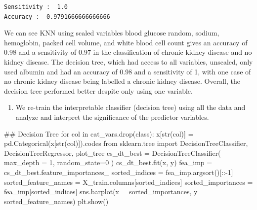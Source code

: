 \documentclass[
  11pt,
  letterpaper,
  DIV=11,
  numbers=noendperiod]{scrartcl}
\newenvironment{Shaded}{\begin{snugshade}}{\end{snugshade}}
\newcommand{\BuiltInTok}[1]{\textcolor[rgb]{0.00,0.23,0.31}{#1}}
\newcommand{\CommentTok}[1]{\textcolor[rgb]{0.37,0.37,0.37}{#1}}
\newcommand{\ControlFlowTok}[1]{\textcolor[rgb]{0.00,0.23,0.31}{#1}}
\newcommand{\DecValTok}[1]{\textcolor[rgb]{0.68,0.00,0.00}{#1}}
\newcommand{\ImportTok}[1]{\textcolor[rgb]{0.00,0.46,0.62}{#1}}
\newcommand{\KeywordTok}[1]{\textcolor[rgb]{0.00,0.23,0.31}{#1}}
\newcommand{\NormalTok}[1]{\textcolor[rgb]{0.00,0.23,0.31}{#1}}
\newcommand{\OperatorTok}[1]{\textcolor[rgb]{0.37,0.37,0.37}{#1}}
\newcommand{\StringTok}[1]{\textcolor[rgb]{0.13,0.47,0.30}{#1}}
\providecommand{\tightlist}{%
  \setlength{\itemsep}{0pt}\setlength{\parskip}{0pt}}\usepackage{longtable,booktabs,array}
\begin{document}
\begin{verbatim}
Sensitivity :  1.0
Accuracy :  0.9791666666666666
\end{verbatim}

We can see KNN using scaled variables blood glucose random, sodium,
hemoglobin, packed cell volume, and white blood cell count gives an
accuracy of 0.98 and a sensitivity of 0.97 in the classification of
chronic kidney disease and no kidney disease. The decision tree, which
had access to all variables, unscaled, only used albumin and had an
accuracy of 0.98 and a sensitivity of 1, with one case of no chronic
kidney disease being labelled a chronic kidney disease. Overall, the
decision tree performed better despite only using one variable.

\begin{enumerate}
\def\labelenumi{\arabic{enumi}.}
\setcounter{enumi}{12}
\tightlist
\item
  We re-train the interpretable classifier (decision tree) using all the
  data and analyze and interpret the significance of the predictor
  variables.
\end{enumerate}

\begin{Shaded}
\begin{Highlighting}[]
\CommentTok{\#\# Decision Tree}
\ControlFlowTok{for}\NormalTok{ col }\KeywordTok{in}\NormalTok{ cat\_vars.drop(}\StringTok{\textquotesingle{}class\textquotesingle{}}\NormalTok{):}
\NormalTok{    x[}\BuiltInTok{str}\NormalTok{(col)] }\OperatorTok{=}\NormalTok{ pd.Categorical(x[}\BuiltInTok{str}\NormalTok{(col)]).codes}
\ImportTok{from}\NormalTok{ sklearn.tree }\ImportTok{import}\NormalTok{ DecisionTreeClassifier, DecisionTreeRegressor, plot\_tree}
\NormalTok{cs\_dt\_best }\OperatorTok{=}\NormalTok{ DecisionTreeClassifier(}
\NormalTok{    max\_depth }\OperatorTok{=} \DecValTok{1}\NormalTok{, }
\NormalTok{    random\_state}\OperatorTok{=}\DecValTok{0}
\NormalTok{    ) }
\NormalTok{cs\_dt\_best.fit(x, y)}
\NormalTok{fea\_imp }\OperatorTok{=}\NormalTok{ cs\_dt\_best.feature\_importances\_}
\NormalTok{sorted\_indices }\OperatorTok{=}\NormalTok{ fea\_imp.argsort()[::}\OperatorTok{{-}}\DecValTok{1}\NormalTok{]}
\NormalTok{sorted\_feature\_names }\OperatorTok{=}\NormalTok{ X\_train.columns[sorted\_indices]}
\NormalTok{sorted\_importances }\OperatorTok{=}\NormalTok{ fea\_imp[sorted\_indices]}
\NormalTok{sns.barplot(x }\OperatorTok{=}\NormalTok{ sorted\_importances, y }\OperatorTok{=}\NormalTok{ sorted\_feature\_names)}
\NormalTok{plt.show()}
\end{Highlighting}
\end{Shaded}
\end{document}

